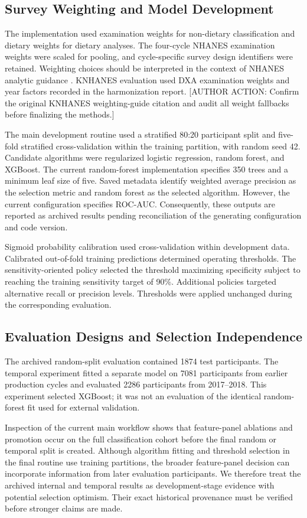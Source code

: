 \documentclass[11pt,a4paper]{article}
\newcommand{\pending}[1]{\textcolor{red!65!black}{[AUTHOR ACTION: #1]}}
\begin{document}
\subsection{Survey Weighting and Model Development}
The implementation used examination weights for non-dietary classification and dietary weights for dietary analyses. The four-cycle NHANES examination weights were scaled for pooling, and cycle-specific survey design identifiers were retained. Weighting choices should be interpreted in the context of NHANES analytic guidance \cite{nhanes}. KNHANES evaluation used DXA examination weights and year factors recorded in the harmonization report. \pending{Confirm the original KNHANES weighting-guide citation and audit all weight fallbacks before finalizing the methods.}

The main development routine used a stratified 80:20 participant split and five-fold stratified cross-validation within the training partition, with random seed 42. Candidate algorithms were regularized logistic regression, random forest, and XGBoost. The current random-forest implementation specifies 350 trees and a minimum leaf size of five. Saved metadata identify weighted average precision as the selection metric and random forest as the selected algorithm. However, the current configuration specifies ROC-AUC. Consequently, these outputs are reported as archived results pending reconciliation of the generating configuration and code version.

Sigmoid probability calibration used cross-validation within development data. Calibrated out-of-fold training predictions determined operating thresholds. The sensitivity-oriented policy selected the threshold maximizing specificity subject to reaching the training sensitivity target of 90\%. Additional policies targeted alternative recall or precision levels. Thresholds were applied unchanged during the corresponding evaluation.

\subsection{Evaluation Designs and Selection Independence}
The archived random-split evaluation contained 1874 test participants. The temporal experiment fitted a separate model on 7081 participants from earlier production cycles and evaluated 2286 participants from 2017--2018. This experiment selected XGBoost; it was not an evaluation of the identical random-forest fit used for external validation.

Inspection of the current main workflow shows that feature-panel ablations and promotion occur on the full classification cohort before the final random or temporal split is created. Although algorithm fitting and threshold selection in the final routine use training partitions, the broader feature-panel decision can incorporate information from later evaluation participants. We therefore treat the archived internal and temporal results as development-stage evidence with potential selection optimism. Their exact historical provenance must be verified before stronger claims are made.
\end{document}
